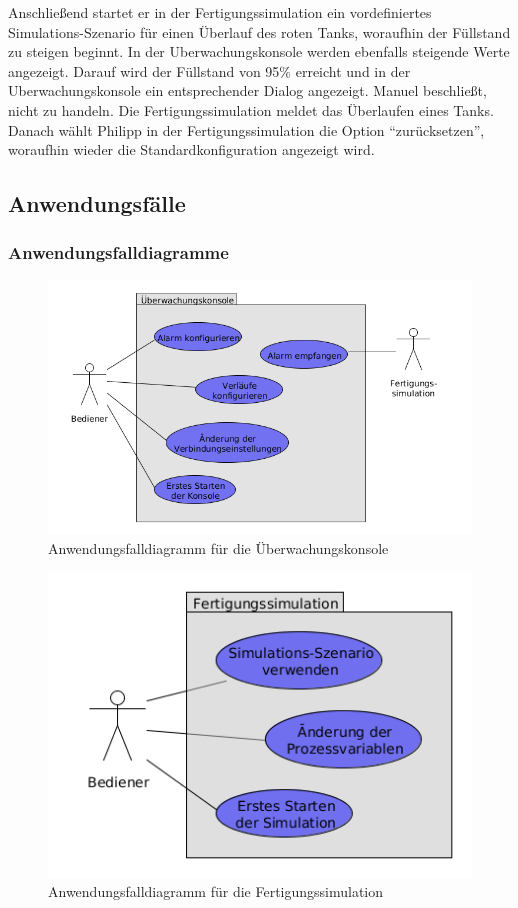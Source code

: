 \documentclass[parskip=full]{scrartcl}
\begin{document}
Anschlie{\ss}end startet er in der \gls{Fertigungssimulation} ein vordefiniertes Simulations-Szenario für einen Überlauf
des roten Tanks, woraufhin der F\"ullstand zu steigen beginnt. In der \gls{Uberwachungskonsole} werden ebenfalls steigende Werte angezeigt.
Darauf wird der F\"ullstand von 95\% erreicht und in der \gls{Uberwachungskonsole} ein entsprechender Dialog angezeigt. Manuel
beschlie{\ss}t, nicht zu handeln. Die \gls{Fertigungssimulation} meldet das Überlaufen eines Tanks.
Danach w\"ahlt Philipp in der \gls{Fertigungssimulation} die Option "`zur\"ucksetzen"',
woraufhin wieder die Standardkonfiguration angezeigt wird.

\subsection{Anwendungsfälle}
\subsubsection{Anwendungsfalldiagramme}
\begin{figure}[H]
  \centering
  \includegraphics[scale=0.62]{media/UseCases/Ueberwachungskonsole.png}
  \caption{Anwendungsfalldiagramm für die Überwachungskonsole}
\end{figure}
\begin{figure}[H]
  \centering
  \includegraphics[scale=0.62]{media/UseCases/Fertigungssimulation.png}
  \caption{Anwendungsfalldiagramm für die Fertigungssimulation}
\end{figure}
\end{document}
